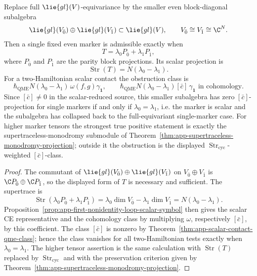 \begin{prop}
\label{prop:app-even-block-marker-obstruction}
  Replace full \(\lie{gl}(V)\)-equivariance by the smaller even
  block-diagonal subalgebra
  \[
    \lie{gl}(V_{\bar0})\oplus\lie{gl}(V_{\bar1})
      \subset \lie{gl}(V),
    \qquad
    V_{\bar0}\cong V_{\bar1}\cong\C^N .
  \]
  Then a single fixed even marker is admissible exactly when
  \[
    T=\lambda_0P_{\bar0}+\lambda_1P_{\bar1},
  \]
  where \(P_{\bar0}\) and \(P_{\bar1}\) are the parity block
  projections.  Its scalar projection is
  \[
    \operatorname{Str}(T)=N(\lambda_0-\lambda_1).
  \]
  For a two-Hamiltonian scalar contact the obstruction class is
  \[
    \hbar_{\mathrm{QME}}N(\lambda_0-\lambda_1)\,
    \omega(f,g)\gamma_{\mathbf 1},
    \qquad
    \hbar_{\mathrm{QME}}N(\lambda_0-\lambda_1)[\bar c]\,\gamma_{\mathbf 1}
    \text{ in cohomology}.
  \]
  Since \([\bar c]\neq0\) in the scalar-reduced source, this smaller
  subalgebra has zero \([\bar c]\)-projection for single markers if and only if
  \(\lambda_0=\lambda_1\), i.e. the marker is scalar and the subalgebra
  has collapsed back to the full-equivariant single-marker case.  For
  higher marker tensors the strongest true positive statement is exactly
  the supertraceless-monodromy submodule of
  Theorem~\ref{thm:app-supertraceless-monodromy-projection}; outside it
  the obstruction is the displayed
  \(\operatorname{Str}_{\mathrm{cyc}}\)-weighted \([\bar c]\)-class.
\end{prop}

\begin{proof}
  The commutant of
  \(\lie{gl}(V_{\bar0})\oplus\lie{gl}(V_{\bar1})\) on
  \(V_{\bar0}\oplus V_{\bar1}\) is
  \(\C P_{\bar0}\oplus\C P_{\bar1}\), so the displayed form of \(T\) is
  necessary and sufficient.  The supertrace is
  \[
    \operatorname{Str}(\lambda_0P_{\bar0}+\lambda_1P_{\bar1})
      =
    \lambda_0\dim V_{\bar0}-\lambda_1\dim V_{\bar1}
      =
    N(\lambda_0-\lambda_1).
  \]
  Proposition~\ref{prop:app-first-nonidentity-loop-scalar-symbol} then
  gives the scalar CE representative and the cohomology class by
  multiplying \(\omega\), respectively \([\bar c]\), by this coefficient.
  The class \([\bar c]\) is nonzero by
  Theorem~\ref{thm:app-scalar-contact-qme-class}; hence the class
  vanishes for all two-Hamiltonian tests exactly when
  \(\lambda_0=\lambda_1\).  The higher tensor assertion is the same
  calculation with
  \(\operatorname{Str}(T)\) replaced by
  \(\operatorname{Str}_{\mathrm{cyc}}\) and with the preservation
  criterion given by
  Theorem~\ref{thm:app-supertraceless-monodromy-projection}.
\end{proof}

